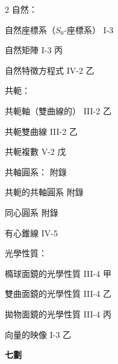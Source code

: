 \begin{multicols}{2}
\noindent 自然：\par
\noindent\hspace*{1.5em} 自然座標系（$S_0$-座標系） \hfill I-3\par
\noindent\hspace*{1.5em} 自然矩陣 \hfill I-3 丙\par
\noindent\hspace*{1.5em} 自然特徵方程式 \hfill IV-2 乙\par
\noindent 共軛：\par
\noindent\hspace*{1.5em} 共軛軸（雙曲線的） \hfill III-2 乙\par
\noindent\hspace*{1.5em} 共軛雙曲線 \hfill III-2 乙\par
\noindent\hspace*{1.5em} 共軛複數 \hfill V-2 戊\par
\noindent 共軸圓系： \hfill 附錄\par
\noindent\hspace*{1.5em} 共軛的共軸圓系 \hfill 附錄\par
\noindent 同心圓系 \hfill 附錄\par
\noindent 有心錐線 \hfill IV-5\par
\noindent 光學性質：\par
\noindent\hspace*{1.5em} 橢球面鏡的光學性質 \hfill III-4 甲\par
\noindent\hspace*{1.5em} 雙曲面鏡的光學性質 \hfill III-4 乙\par
\noindent\hspace*{1.5em} 拋物面鏡的光學性質 \hfill III-4 丙\par
\noindent 向量的映像 \hfill I-3 乙\par

\vspace{0.8em}
\begin{center}
\textbf{\large 七\quad 劃}
\end{center}


\end{multicols}
